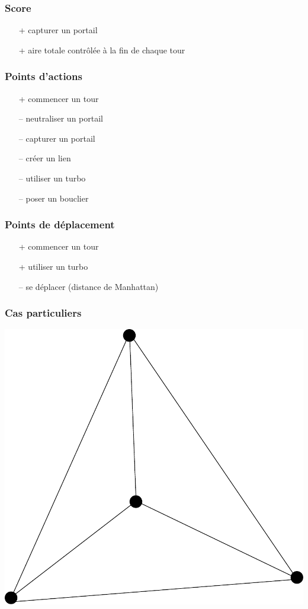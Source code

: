 \documentclass{beamer}
\begin{document}
\begin{frame}
	\frametitle{Score}
	\begin{itemize}
	\item[+] capturer un portail
    \item[+] aire totale contrôlée à la fin de chaque tour
	\end{itemize}
\end{frame}

\begin{frame}
	\frametitle{Points d'actions}
	\begin{itemize}
	\item[+] commencer un tour
	\item[\alert{--}] neutraliser un portail
	\item[\alert{--}] capturer un portail
	\item[\alert{--}] créer un lien
	\item[\alert{--}] utiliser un turbo
	\item[\alert{--}] poser un bouclier
	\end{itemize}
\end{frame}

\begin{frame}
	\frametitle{Points de déplacement}
	\begin{itemize}
	\item[+] commencer un tour
	\item[+] utiliser un turbo
    \item[\alert{--}] se déplacer (distance de Manhattan)
	\end{itemize}
\end{frame}

\begin{frame}
	\frametitle{Cas particuliers}
    \begin{center}
    \includegraphics[height=0.7\textheight]{../triangle3.pdf}
    \end{center}
\end{frame}
\end{document}
